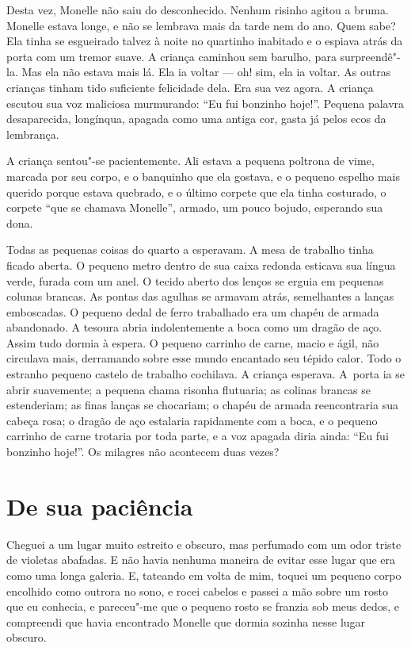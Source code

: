 Desta vez, Monelle não saiu do desconhecido. Nenhum risinho agitou a
bruma. Monelle estava longe, e não se lembrava mais da tarde nem do ano.
Quem sabe? Ela tinha se esgueirado talvez à noite no quartinho inabitado e
o espiava atrás da porta com um tremor suave. A criança caminhou sem
barulho, para surpreendê"-la. Mas ela não estava mais lá. Ela ia voltar ---
oh! sim, ela ia voltar. As outras crianças tinham tido suficiente
felicidade dela. Era sua vez agora. A criança escutou sua voz maliciosa
murmurando: “Eu fui bonzinho hoje!”. Pequena palavra desaparecida,
longínqua, apagada como uma antiga cor, gasta já pelos ecos da lembrança.

A criança sentou"-se pacientemente. Ali estava a pequena poltrona de
vime, marcada por seu corpo, e o banquinho que ela gostava, e o pequeno
espelho mais querido porque estava quebrado, e o último corpete que ela
tinha costurado, o corpete “que se chamava Monelle”, armado, um pouco
bojudo, esperando sua dona.

Todas as pequenas coisas do quarto a esperavam. A mesa de trabalho
tinha ficado aberta. O pequeno metro dentro de sua caixa redonda esticava
sua língua verde, furada com um anel. O tecido aberto dos lenços se erguia
em pequenas colunas brancas. As pontas das agulhas se armavam atrás,
semelhantes a lanças emboscadas. O pequeno dedal de ferro trabalhado era
um chapéu de armada abandonado. A tesoura abria indolentemente a boca como
um dragão de aço. Assim tudo dormia à espera. O pequeno carrinho de carne,
macio e ágil, não circulava mais, derramando sobre esse mundo encantado
seu tépido calor. Todo o estranho pequeno castelo de trabalho cochilava. A
criança esperava. \mbox{A porta} ia se abrir suavemente; a pequena chama risonha
flutuaria; as colinas brancas se estenderiam; as finas lanças se
chocariam; o chapéu de armada reencontraria sua cabeça rosa; o dragão de
aço estalaria rapidamente com a boca, e o pequeno carrinho de carne
trotaria por toda parte, e a voz apagada diria ainda: “Eu fui bonzinho
hoje!”. Os milagres não acontecem duas vezes?

\section*{De sua paciência}

Cheguei a um lugar muito estreito e obscuro, mas perfumado com um odor
triste de violetas abafadas. E não havia nenhuma maneira de evitar esse
lugar que era como uma longa galeria. E, tateando em volta de mim, toquei
um pequeno corpo encolhido como outrora no sono, e rocei cabelos e passei
a mão sobre um rosto que eu conhecia, e pareceu"-me que o pequeno rosto se
franzia sob meus dedos, e compreendi que havia encontrado Monelle que
dormia sozinha nesse lugar obscuro.

